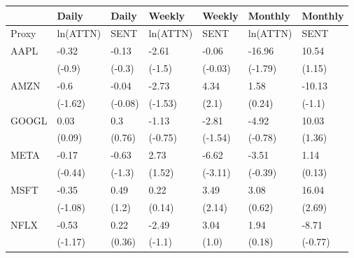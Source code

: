\begin{tabular}{lllllll}
\toprule
{} &     Daily &    Daily &    Weekly &   Weekly &   Monthly &  Monthly \\
\midrule
Proxy &  ln(ATTN) &     SENT &  ln(ATTN) &     SENT &  ln(ATTN) &     SENT \\
AAPL  &     -0.32 &    -0.13 &     -2.61 &    -0.06 &    -16.96 &    10.54 \\
      &    (-0.9) &   (-0.3) &    (-1.5) &  (-0.03) &   (-1.79) &   (1.15) \\
AMZN  &      -0.6 &    -0.04 &     -2.73 &     4.34 &      1.58 &   -10.13 \\
      &   (-1.62) &  (-0.08) &   (-1.53) &    (2.1) &    (0.24) &   (-1.1) \\
GOOGL &      0.03 &      0.3 &     -1.13 &    -2.81 &     -4.92 &    10.03 \\
      &    (0.09) &   (0.76) &   (-0.75) &  (-1.54) &   (-0.78) &   (1.36) \\
META  &     -0.17 &    -0.63 &      2.73 &    -6.62 &     -3.51 &     1.14 \\
      &   (-0.44) &   (-1.3) &    (1.52) &  (-3.11) &   (-0.39) &   (0.13) \\
MSFT  &     -0.35 &     0.49 &      0.22 &     3.49 &      3.08 &    16.04 \\
      &   (-1.08) &    (1.2) &    (0.14) &   (2.14) &    (0.62) &   (2.69) \\
NFLX  &     -0.53 &     0.22 &     -2.49 &     3.04 &      1.94 &    -8.71 \\
      &   (-1.17) &   (0.36) &    (-1.1) &    (1.0) &    (0.18) &  (-0.77) \\
\bottomrule
\end{tabular}
